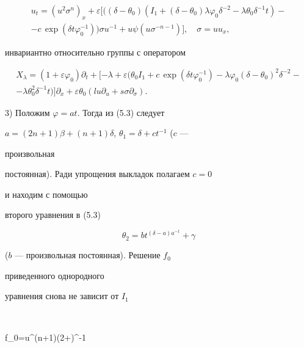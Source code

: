 \begin{multline}


u_t=(u^2\sigma^n)_x+\varepsilon[((\delta-\theta_0)(I_1+


(\delta-\theta_0)\lambda\varphi_0\delta^{-2}


-\lambda\theta_0\delta^{-1}t)-\\


-c\,\exp(\delta t\varphi^{-1}_0))


\sigma u^{-1}+u\psi(u\sigma^{-n-1})],\quad \sigma=uu_x, \tag{5.6}


\end{multline}


инвариантно относительно группы с оператором


\begin{multline}


X_\lambda=(1+\varepsilon\varphi_0)\partial_t+


[-\lambda+\varepsilon(\theta_0I_1+c\,\exp(\delta t\varphi^{-1}_0)


-\lambda\varphi_0(\delta-\theta_0)^2\delta^{-2}-\\


-\lambda\theta^2_0\delta^{-1}t)]\partial_x+


\varepsilon\theta_0(lu\partial_u+s\sigma\partial_\sigma).


\tag{5.7}


\end{multline}





3) Положим $\varphi=at$. Тогда из (5.3) следует


$a=(2n+1)\beta+(n+1)\delta$, $\theta_1=\delta+ct^{-1}$ ($c$ ---


произвольная


постоянная). Ради упрощения выкладок полагаем $c=0$


и находим с помощью


второго уравнения в (5.3)


$$


\theta_2=bt^{(\delta-a)a^{-1}}+\gamma


$$


($b$ --- произвольная постоянная). Решение $f_0$


приведенного однородного


уравнения снова не зависит от $I_1$


$$


f_0=u^{(n+1)(2\beta+\delta)\beta^{-1}}


